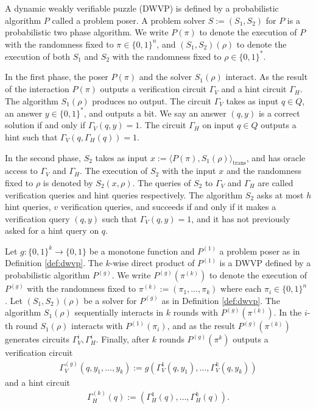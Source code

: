 %
\begin{definition}
  \label{def:dwvp}
  A dynamic weakly verifiable puzzle (DWVP) is defined by a probabilistic algorithm $P$
  called a problem poser.
  A problem solver $S := (S_1, S_2)$ for $P$ is a probabilistic two phase algorithm.
  We write $P(\pi)$ to denote the execution of $P$ with the randomness fixed to $\pi \in \{0,1\}^n$, and $(S_1,S_2)(\rho)$
  to denote the execution of both $S_1$ and $S_2$ with the randomness fixed to $\rho \in \{0,1\}^{*}$.

  In the first phase, the poser $P(\pi)$ and the solver $S_1(\rho)$ interact.
  As the result of the interaction $P(\pi)$ outputs a verification circuit $\Gamma_{V}$ and a hint circuit $\Gamma_{H}$.
  The algorithm $S_1(\rho)$ produces no output.
  The circuit $\Gamma_{V}$ takes as input $q \in Q$, an answer $y \in \{0,1\}^*$,
  and outputs a bit. We say an answer $(q,y)$ is a correct solution if and only if $\Gamma_V(q,y) = 1$.
  The circuit $\Gamma_H$ on input $q \in Q$ outputs a hint such that $\Gamma_V(q,\Gamma_H(q)) = 1$.

  In the second phase, $S_2$ takes as input $x := \langle P(\pi), S_1(\rho) \rangle_{\text{trans}}$,
  and has oracle access to $\Gamma_V$ and $\Gamma_H$.
  The execution of $S_2$ with the input $x$ and the randomness fixed to $\rho$
  is denoted by $S_2(x, \rho)$. The queries of $S_2$ to $\Gamma_V$ and $\Gamma_H$ are called verification queries and hint queries respectively.
  The algorithm $S_2$ asks at most $h$ hint queries, $v$ verification queries, and succeeds if and only if
  it makes a verification query $(q,y)$ such that $\Gamma_V(q,y) = 1$, and it has not previously asked for a hint query on $q$.
\end{definition}
%
\begin{definition}
  Let $g: \{0,1\}^{k} \rightarrow \{0,1\}$ be a monotone function and $P^{(1)}$ a problem poser as in Definition \ref{def:dwvp}.
  The $k$-wise direct product of $P^{(1)}$ is a DWVP defined by a probabilistic algorithm $P^{(g)}$.
  We write $P^{(g)}(\pi^{(k)})$ to denote the execution of $P^{(g)}$ with the randomness fixed to $\pi^{(k)} := (\pi_1, \dots, \pi_k)$ where each $\pi_i \in \{0,1\}^n$ .
  Let $(S_1, S_2)(\rho)$ be a solver for $P^{(g)}$ as in Definition \ref{def:dwvp}.
  The algorithm $S_1(\rho)$ sequentially interacts in $k$ rounds with $P^{(g)}(\pi^{(k)})$.
  In the $i$-th round $S_1(\rho)$ interacts with $P^{(1)}(\pi_i)$,
  and as the result $P^{(g)}(\pi^{(k)})$ generates circuits $\Gamma_V^i, \Gamma_H^i$.
  Finally, after $k$ rounds $P^{(g)}(\pi^{k})$ outputs a verification circuit
\begin{align*}
  \Gamma_V^{(g)} (q, y_1, \dots, y_k) := g(\Gamma_V^{1}(q, y_1), \dots, \Gamma_V^{k}(q, y_k))
\end{align*}
and a hint circuit
\begin{align*}
  \Gamma_H^{(k)} (q) := (\Gamma_H^{1}(q), \dots, \Gamma_H^{k}(q)).
\end{align*}
\end{definition}

